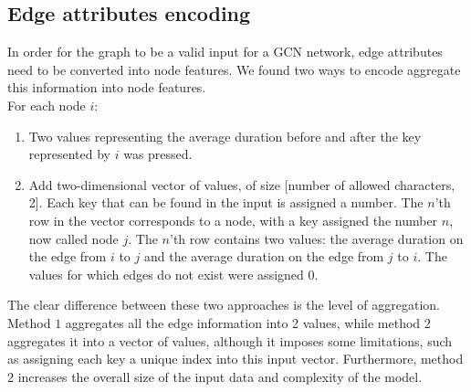 \subsection{Edge attributes encoding}
In order for the graph to be a valid input for a GCN network, edge attributes need to be converted into node features. We found two ways to encode aggregate this information into node features.\\  
For each node $i$:
\begin{enumerate}
	\item Two values representing the average duration before and after the key represented by $i$ was pressed.
	\item Add two-dimensional vector of values, of size [number of allowed characters, 2]. Each key that can be found in the input is assigned a number. The $n$'th row in the vector corresponds to a node, with a key assigned the number $n$, now called node $j$. The $n$'th row contains two values: the average duration on the edge from $i$ to $j$ and the average duration on the edge from $j$ to $i$. The values for which edges do not exist were assigned 0.
\end{enumerate}
The clear difference between these two approaches is the level of aggregation. Method $1$ aggregates all the edge information into 2 values, while method $2$ aggregates it into a vector of values, although it imposes some limitations, such as assigning each key a unique index into this input vector. Furthermore, method $2$ increases the overall size of the input data and complexity of the model.


